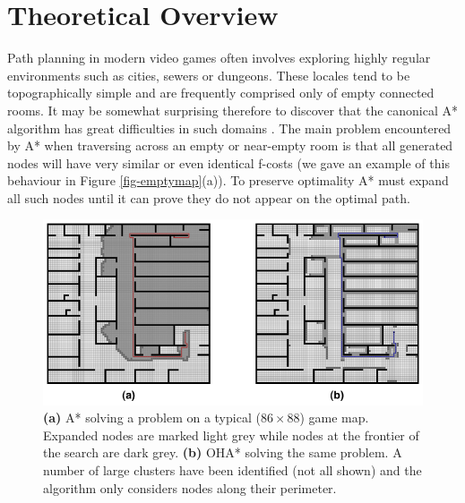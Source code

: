 \section{Theoretical Overview}
Path planning in modern video games often involves exploring highly regular 
environments such as cities, sewers or dungeons.
These locales tend to be topographically simple and are frequently comprised only
of empty connected rooms.
It may be somewhat surprising therefore to discover that the canonical A* 
algorithm\cite{hart68} has great difficulties in such domains .
The main problem encountered by A* when traversing across an empty or near-empty 
room is that all generated nodes will have very similar or even identical f-costs
(we gave an example of this behaviour in Figure \ref{fig-emptymap}(a)).
To preserve optimality A* must expand all such nodes until it can prove they do 
not appear on the optimal path.
\begin{figure}[htbp]
	\label{fig-oha_contrast}
	\vspace{-4pt}
       \begin{center}
           \includegraphics[scale=0.40, trim = 10mm 10mm 10mm 0mm]{diagrams/oha_contrast.png}
       \end{center}
	\vspace{-3pt}
       \caption{\textbf{(a)} A* solving a problem on a typical ($86\times88$) game map. 
Expanded nodes are marked light grey while nodes at the frontier of the search are dark grey.
\textbf{(b)} OHA* solving the same problem. A number of large clusters have been identified (not
all shown) and the algorithm only considers nodes along their perimeter.}
       \label{fig-ohacontrast}
	\vspace{-15pt}
\end{figure}


